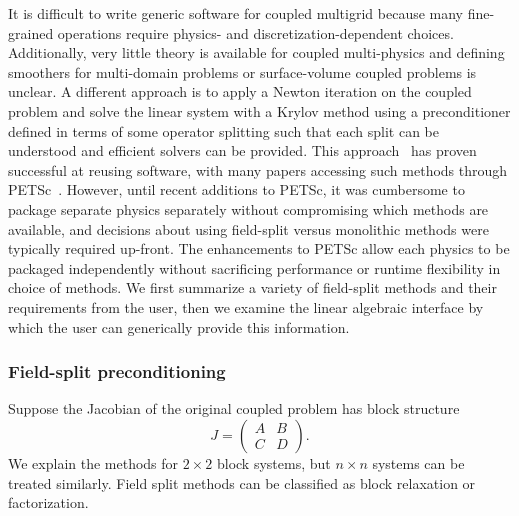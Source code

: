 It is difficult to write generic software for coupled multigrid because many fine-grained operations require physics- and discretization-dependent choices.
Additionally, very little theory is available for coupled multi-physics and defining smoothers for multi-domain problems or surface-volume coupled problems is unclear.
A different approach is to apply a Newton iteration on the coupled problem and solve the linear system with a Krylov method using a preconditioner defined in terms of some operator splitting such that each split can be understood and efficient solvers can be provided.
This approach~\cite{knoll2004jfn} has proven successful at reusing software, with many papers accessing such methods through PETSc~\cite{petsc-web-page}.
However, until recent additions to PETSc, it was cumbersome to package separate physics separately without compromising which methods are available, and decisions about using field-split versus monolithic methods were typically required up-front.
The enhancements to PETSc allow each physics to be packaged independently without sacrificing performance or runtime flexibility in choice of methods.
We first summarize a variety of field-split methods and their requirements from the user, then we examine the linear algebraic interface by which the user can generically provide this information.

\subsubsection{Field-split preconditioning}
Suppose the Jacobian of the original coupled problem has block structure
\begin{equation}\label{eq:fieldsplit:jacobian}
  J = \begin{pmatrix} A & B \\ C & D \end{pmatrix} .
\end{equation}
We explain the methods for $2\times 2$ block systems, but $n\times n$ systems can be treated similarly.
Field split methods can be classified as block relaxation or factorization.

